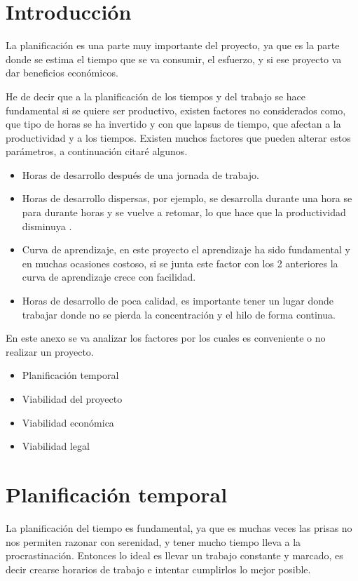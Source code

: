 
\section{Introducción}

La planificación es una parte muy importante del proyecto, ya que es la parte donde se estima el tiempo que se va consumir, el esfuerzo, y si ese proyecto va dar beneficios económicos.

He de decir que a la planificación de los tiempos y del trabajo se hace fundamental si se quiere ser productivo, existen factores no considerados como, que tipo de horas se ha invertido y con que lapsus de tiempo, que afectan a la productividad y a los tiempos. Existen muchos factores que pueden alterar estos parámetros, a continuación citaré algunos.

\begin{itemize}
\item
Horas de desarrollo después de una jornada de trabajo.
\item
Horas de desarrollo dispersas, por ejemplo, se desarrolla durante una hora se para durante horas y se vuelve a retomar, lo que hace que la productividad disminuya .
\item
Curva de aprendizaje, en este proyecto el aprendizaje ha sido fundamental y en muchas ocasiones costoso, si se junta este factor con los 2 anteriores la curva de aprendizaje crece con facilidad.
\item
Horas de desarrollo de poca calidad, es importante tener un lugar donde trabajar donde no se pierda la concentración y el hilo de forma continua.
\end{itemize}

En este anexo se va analizar los factores por los cuales es conveniente o no realizar un proyecto.
\begin{itemize}
\item
Planificación temporal
\item
Viabilidad del proyecto
\item
Viabilidad económica
\item
Viabilidad legal
\end{itemize}
\section{Planificación temporal}

La planificación del tiempo es fundamental, ya que es muchas veces las prisas no nos permiten razonar con serenidad, y tener mucho tiempo lleva a la procrastinación. Entonces lo ideal es llevar un trabajo constante y marcado, es decir crearse horarios de trabajo e intentar cumplirlos lo mejor posible.

